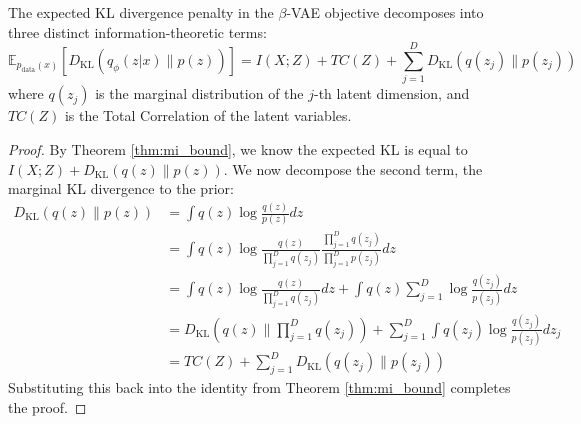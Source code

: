 \begin{theorem}[KL Decomposition]
\label{thm:kl_decomp}
The expected KL divergence penalty in the $\beta$-VAE objective decomposes into three distinct information-theoretic terms:
\begin{equation}
    \mathbb{E}_{p_{\text{data}}(x)} \left[ D_{\text{KL}}(q_\phi(z|x) \parallel p(z)) \right] = I(X; Z) + TC(Z) + \sum_{j=1}^D D_{\text{KL}}(q(z_j) \parallel p(z_j))
\end{equation}
where $q(z_j)$ is the marginal distribution of the $j$-th latent dimension, and $TC(Z)$ is the Total Correlation of the latent variables.
\end{theorem}

\begin{proof}
By Theorem \ref{thm:mi_bound}, we know the expected KL is equal to $I(X;Z) + D_{\text{KL}}(q(z) \parallel p(z))$. We now decompose the second term, the marginal KL divergence to the prior:
\begin{align}
    D_{\text{KL}}(q(z) \parallel p(z)) &= \int q(z) \log \frac{q(z)}{p(z)} dz \\
    &= \int q(z) \log \frac{q(z)}{\prod_{j=1}^D q(z_j)} \frac{\prod_{j=1}^D q(z_j)}{\prod_{j=1}^D p(z_j)} dz \\
    &= \int q(z) \log \frac{q(z)}{\prod_{j=1}^D q(z_j)} dz + \int q(z) \sum_{j=1}^D \log \frac{q(z_j)}{p(z_j)} dz \\
    &= D_{\text{KL}}\left( q(z) \parallel \prod_{j=1}^D q(z_j) \right) + \sum_{j=1}^D \int q(z_j) \log \frac{q(z_j)}{p(z_j)} dz_j \\
    &= TC(Z) + \sum_{j=1}^D D_{\text{KL}}(q(z_j) \parallel p(z_j))
\end{align}
Substituting this back into the identity from Theorem \ref{thm:mi_bound} completes the proof.
\end{proof}

